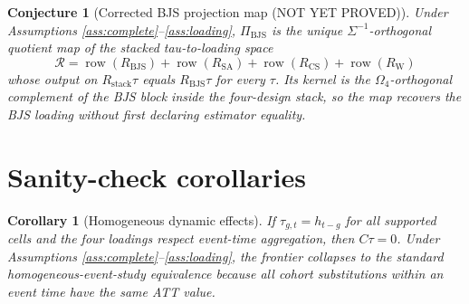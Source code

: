 \documentclass[11pt]{article}
\theoremstyle{definition}
\theoremstyle{plain}
\newtheorem{conjecture}{Conjecture}
\newtheorem{corollary}{Corollary}
\theoremstyle{remark}
\begin{document}
\begin{conjecture}[Corrected BJS projection map (NOT YET PROVED)]\label{conj:projection}
Under Assumptions \ref{ass:complete}--\ref{ass:loading},
\(\Pi_{\mathrm{BJS}}\) is the unique \(\Sigma^{-1}\)-orthogonal quotient map of the
stacked tau-to-loading space
\[
\mathcal R=\operatorname{row}(R_{\mathrm{BJS}})+\operatorname{row}(R_{\mathrm{SA}})
+\operatorname{row}(R_{\mathrm{CS}})+\operatorname{row}(R_{\mathrm{W}})
\]
whose output on \(R_{\mathrm{stack}}\tau\) equals \(R_{\mathrm{BJS}}\tau\) for
every \(\tau\). Its kernel is the \(\Omega_4\)-orthogonal complement of the BJS
block inside the four-design stack, so the map recovers the BJS loading without
first declaring estimator equality.
\end{conjecture}

\section{Sanity-check corollaries}
\begin{corollary}[Homogeneous dynamic effects]\label{cor:homogeneous}
If \(\tau_{g,t}=h_{t-g}\) for all supported cells and the four loadings respect
event-time aggregation, then \(C\tau=0\). Under Assumptions
\ref{ass:complete}--\ref{ass:loading}, the frontier collapses to the standard
homogeneous-event-study equivalence because all cohort substitutions within an
event time have the same ATT value.
\end{corollary}
\end{document}

